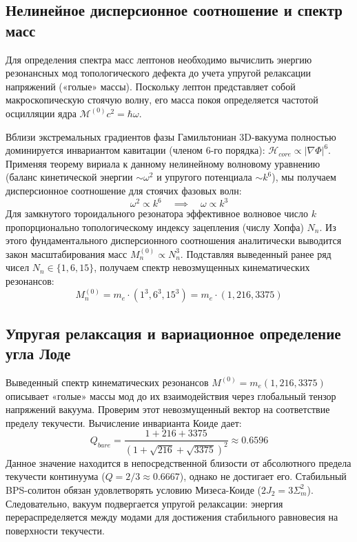 \documentclass[12pt,a4paper]{article}
\begin{document}
	\subsection{Нелинейное дисперсионное соотношение и спектр масс}
	Для определения спектра масс лептонов необходимо вычислить энергию резонансных мод топологического дефекта до учета упругой релаксации напряжений («голые» массы). Поскольку лептон представляет собой макроскопическую стоячую волну, его масса покоя определяется частотой осцилляции ядра $\mathcal{M}^{(0)} c^2 = \hbar \omega$.
	
	Вблизи экстремальных градиентов фазы Гамильтониан 3D-вакуума полностью доминируется инвариантом кавитации (членом 6-го порядка): $\mathcal{H}_{core} \propto |\nabla \Phi|^6$. 
	Применяя теорему вириала к данному нелинейному волновому уравнению (баланс кинетической энергии $\sim \omega^2$ и упругого потенциала $\sim k^6$), мы получаем дисперсионное соотношение для стоячих фазовых волн:
	\begin{equation}
		\omega^2 \propto k^6 \quad \implies \quad \omega \propto k^3
	\end{equation}
	Для замкнутого тороидального резонатора эффективное волновое число $k$ пропорционально топологическому индексу зацепления (числу Хопфа) $N_n$. 
	Из этого фундаментального дисперсионного соотношения аналитически выводится закон масштабирования масс $M_n^{(0)} \propto N_n^3$.
	Подставляя выведенный ранее ряд чисел $N_n \in \{1, 6, 15\}$, получаем спектр невозмущенных кинематических резонансов:
	\begin{equation}
		M_n^{(0)} = m_e \cdot (1^3, 6^3, 15^3) = m_e \cdot (1, 216, 3375)
	\end{equation}
	
	\subsection{Упругая релаксация и вариационное определение угла Лоде}
	Выведенный спектр кинематических резонансов $M^{(0)} = m_e(1, 216, 3375)$ описывает «голые» массы мод до их взаимодействия через глобальный тензор напряжений вакуума. Проверим этот невозмущенный вектор на соответствие пределу текучести. Вычисление инварианта Коиде дает:
	\begin{equation}
		Q_{bare} = \frac{1 + 216 + 3375}{(1 + \sqrt{216} + \sqrt{3375})^2} \approx 0.6596
	\end{equation}
	Данное значение находится в непосредственной близости от абсолютного предела текучести континуума ($Q=2/3 \approx 0.6667$), однако не достигает его. Стабильный BPS-солитон обязан удовлетворять условию Мизеса-Коиде ($2J_2 = 3\Sigma_m^2$). Следовательно, вакуум подвергается упругой релаксации: энергия перераспределяется между модами для достижения стабильного равновесия на поверхности текучести.
	
\end{document}

